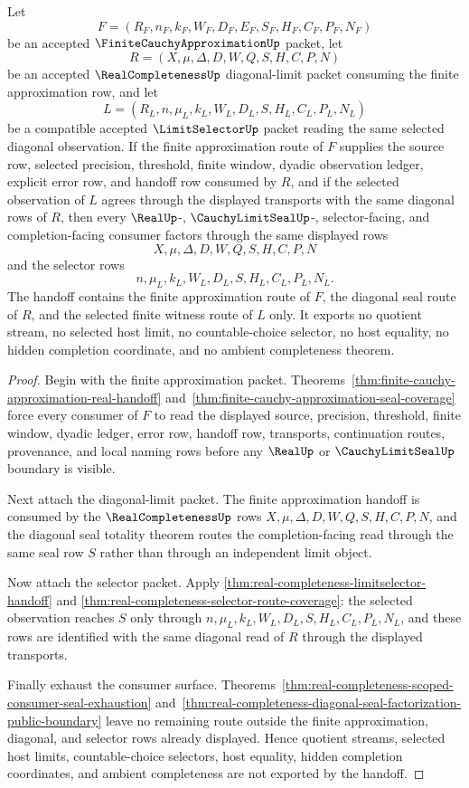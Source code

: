 \begin{theorem}
\label{thm:real-completeness-finite-approximation-limit-selector-handoff}
Let
$$
F=(R_F,n_F,k_F,W_F,D_F,E_F,S_F,H_F,C_F,P_F,N_F)
$$
be an accepted $\FiniteCauchyApproximationUp$ packet, let
$$
R=(X,\mu,\Delta,D,W,Q,S,H,C,P,N)
$$
be an accepted $\RealCompletenessUp$ diagonal-limit packet consuming the finite approximation row, and let
$$
L=(R_L,n,\mu_L,k_L,W_L,D_L,S,H_L,C_L,P_L,N_L)
$$
be a compatible accepted $\LimitSelectorUp$ packet reading the same selected diagonal observation. If the finite approximation route of $F$ supplies the source row, selected precision, threshold, finite window, dyadic observation ledger, explicit error row, and handoff row consumed by $R$, and if the selected observation of $L$ agrees through the displayed transports with the same diagonal rows of $R$, then every $\RealUp$-, $\CauchyLimitSealUp$-, selector-facing, and completion-facing consumer factors through the same displayed rows
$$
X,\mu,\Delta,D,W,Q,S,H,C,P,N
$$
and the selector rows
$$
n,\mu_L,k_L,W_L,D_L,S,H_L,C_L,P_L,N_L.
$$
The handoff contains the finite approximation route of $F$, the diagonal seal route of $R$, and the selected finite witness route of $L$ only. It exports no quotient stream, no selected host limit, no countable-choice selector, no host equality, no hidden completion coordinate, and no ambient completeness theorem.
\end{theorem}
\begin{proof}
Begin with the finite approximation packet. Theorems~\ref{thm:finite-cauchy-approximation-real-handoff} and~\ref{thm:finite-cauchy-approximation-seal-coverage} force every consumer of $F$ to read the displayed source, precision, threshold, finite window, dyadic ledger, error row, handoff row, transports, continuation routes, provenance, and local naming rows before any $\RealUp$ or $\CauchyLimitSealUp$ boundary is visible.

Next attach the diagonal-limit packet. The finite approximation handoff is consumed by the $\RealCompletenessUp$ rows $X,\mu,\Delta,D,W,Q,S,H,C,P,N$, and the diagonal seal totality theorem routes the completion-facing read through the same seal row $S$ rather than through an independent limit object.

Now attach the selector packet. Apply \autoref{thm:real-completeness-limitselector-handoff} and \autoref{thm:real-completeness-selector-route-coverage}: the selected observation reaches $S$ only through $n,\mu_L,k_L,W_L,D_L,S,H_L,C_L,P_L,N_L$, and these rows are identified with the same diagonal read of $R$ through the displayed transports.

Finally exhaust the consumer surface. Theorems~\ref{thm:real-completeness-scoped-consumer-seal-exhaustion} and~\ref{thm:real-completeness-diagonal-seal-factorization-public-boundary} leave no remaining route outside the finite approximation, diagonal, and selector rows already displayed. Hence quotient streams, selected host limits, countable-choice selectors, host equality, hidden completion coordinates, and ambient completeness are not exported by the handoff.
\end{proof}

